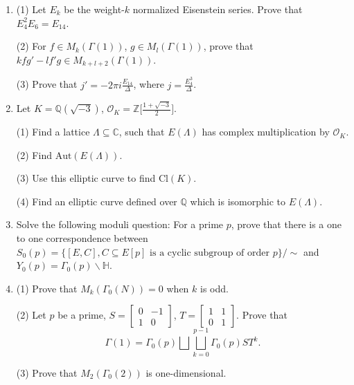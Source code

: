 \begin{enumerate}

    \item

    (1) Let \(E_k\) be the weight-\(k\) normalized Eisenstein series. Prove that \(E_4^2 E_6 = E_{14}\).

    (2) For \(f \in M_k(\Gamma(1))\), \(g \in M_l(\Gamma(1))\), prove that \(kfg'-lf'g \in M_{k+l+2}(\Gamma(1))\).

    (3) Prove that \(j' = -2 \pi i \frac{E_{14}}{\Delta}\), where \(j = \frac{E_4^3}{\Delta}\).

    \item

    Let \(K = \mathbb{Q}(\sqrt{-3})\), \(\mathcal{O}_K = \mathbb{Z}\big[\frac{1+\sqrt{-3}}{2}\big]\).

    (1) Find a lattice $ \Lambda \subseteq \mathbb{C} $, such that $E(\Lambda)$ has complex multiplication by $\mathcal{O}_K$.

    (2) Find $\mathrm{Aut}(E(\Lambda))$.

    (3) Use this elliptic curve to find \(\mathrm{Cl}(K)\).

    (4) Find an elliptic curve defined over \(\mathbb{Q}\) which is isomorphic to \(E(\Lambda)\).

    \item

    Solve the following moduli question: For a prime \(p\), prove that there is a one to one correspondence between
    \(S_0(p) = \{[E,C] , C \subseteq E[p] \text{ is a cyclic subgroup of order }p\} / \sim \)
    and \(Y_0(p) = \Gamma_0(p) \backslash \mathbb{H} \).

    \item

    (1) Prove that \(M_k(\Gamma_0(N)) = 0\) when \(k\) is odd.

    (2) Let \(p\) be a prime, \(S = \begin{bmatrix}
    0 & -1 \\
    1 & 0
    \end{bmatrix}\), \(T = \begin{bmatrix}
    1 & 1 \\
    0 & 1
    \end{bmatrix}\). Prove that 
    \[
        \Gamma(1) = \Gamma_0(p) \bigsqcup \bigsqcup^{p-1}_{k=0} \Gamma_0(p)ST^k.
    \]

    (3) Prove that \(M_2(\Gamma_0(2))\) is one-dimensional.








\end{enumerate}